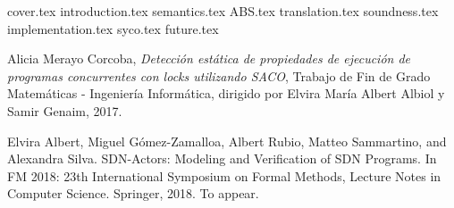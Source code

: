 \documentclass[spanish, a4paper, 12pt] {book}
\begin{document}
{cover.tex}
\tableofcontents
{introduction.tex}
{semantics.tex}
{ABS.tex}
{translation.tex}
{soundness.tex}
{implementation.tex}
{syco.tex}
{future.tex}
\begin{thebibliography}{9}

  Alicia Merayo Corcoba,
  \textit{Detección estática de propiedades de ejecución de programas concurrentes con locks utilizando SACO},
  Trabajo de Fin de Grado Matemáticas - Ingeniería Informática,
  dirigido por Elvira María Albert Albiol y Samir Genaim,
  2017.

 Elvira Albert, Miguel Gómez-Zamalloa, Albert Rubio, Matteo Sammartino, and Alexandra Silva. SDN-Actors: Modeling and Verification of SDN Programs. In FM 2018: 23th International Symposium on Formal Methods, Lecture Notes in Computer Science. Springer, 2018. To appear.
\end{thebibliography}
\end{document}
